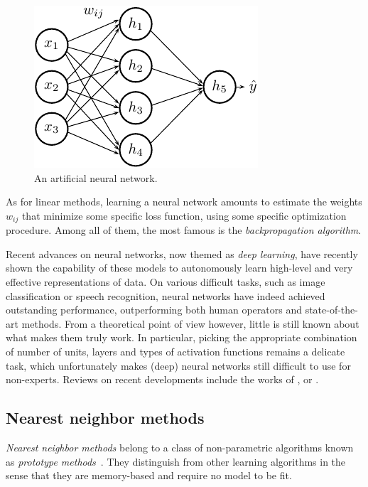 \begin{figure}
    \centering
    \includegraphics[scale=1.0]{figures/ch2_mlp.pdf}
    \caption{An artificial neural network.}
    \label{fig:mlp}
\end{figure}

As for linear methods, learning a neural network  amounts to estimate the
weights $w_{ij}$ that minimize some specific loss function, using some specific
optimization procedure. Among all of them, the most famous is the
\textit{backpropagation algorithm}.

Recent advances on neural networks, now themed as \textit{deep learning}, have
recently shown the capability of these models to autonomously learn high-level
and very effective representations of data. On various difficult tasks, such as
image classification or speech recognition, neural networks have indeed
achieved outstanding performance, outperforming both human operators and
state-of-the-art methods. From a theoretical point of view however, little is
still known about what makes them truly work. In particular, picking the
appropriate combination of number of units, layers and types of activation
functions remains a delicate task, which unfortunately makes (deep) neural
networks still difficult to use for non-experts. Reviews on recent developments
include the works of \citet{hinton:2007}, \citet{arel:2010} or \citet{bengio:2013}.

\subsection{Nearest neighbor methods}

\textit{Nearest neighbor methods} belong to a class of non-parametric algorithms
known as \textit{prototype methods}~\citep{hastie:2005}. They distinguish from
other learning algorithms in the sense that they are memory-based and require
no model to be fit.

